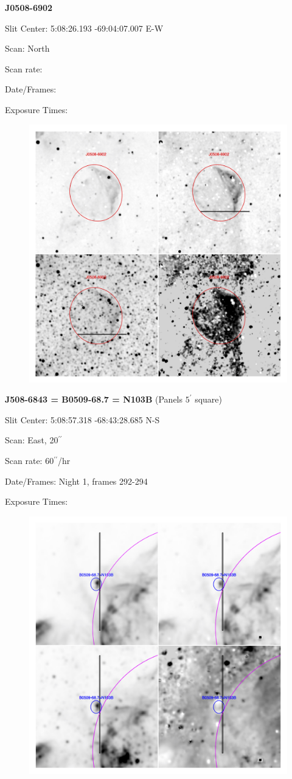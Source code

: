 \documentclass[11pt]{article}
\newcommand{\arcsec}{$^{\prime\prime}$}
\begin{document}
\newpage
{\bf J0508-6902}  
 
Slit Center:   5:08:26.193   -69:04:07.007     E-W

Scan:  North

Scan rate:  

Date/Frames:

Exposure Times:  

\begin{figure}
\includegraphics[width=11.cm]{snapshots/J0508-6902.png}
\end{figure}

\newpage
{\bf J508-6843 = B0509-68.7 = N103B}  (Panels $5^\prime$ square)
 
Slit Center:   5:08:57.318   -68:43:28.685     N-S 

Scan:  East, 20\arcsec

Scan rate:   60\arcsec/hr

Date/Frames:  Night 1, frames 292-294

Exposure Times:  

\begin{figure}
\includegraphics[width=11.cm]{snapshots/N103B_5arcmin.png}
\end{figure}
\end{document}
